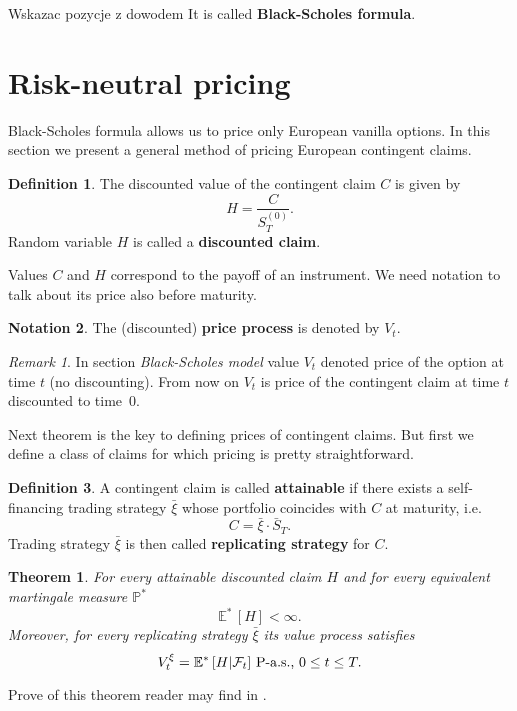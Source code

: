 \documentclass[a4paper,12pt, oneside]{book}
\newtheorem{thm}{Theorem}[section]
\theoremstyle{definition}
\newtheorem{mydef}{Definition}[section]
\newtheorem{notation}[mydef]{Notation}
\theoremstyle{remark}
\newtheorem{remark}{Remark}
\def\Em{{\mathbb{E}^*}\,}
\def\Pm{{\mathbb{P}}^*\,}
\def\Sa{\bar{S}}
\def\xia{\bar{\xi}}
\begin{document}
{\Large \color{red} Wskazac pozycje z dowodem}
It is called \textbf{Black-Scholes formula}.

\section{Risk-neutral pricing}
\label{sec:risk-neutral}
Black-Scholes formula allows us to price only European vanilla options. In this section we present a general method of pricing European contingent claims. 
\begin{mydef}
 The discounted value of the contingent claim $C$ is given by
 \begin{equation*}
  H = \frac{C}{S^{(0)}_T}.
 \end{equation*}
 Random variable $H$ is called a \textbf{discounted claim}.
\end{mydef}

Values $C$ and $H$ correspond to the payoff of an instrument. We need notation to talk about its price also before maturity.
\begin{notation}
 The (discounted) \textbf{price process} is denoted by $V_t$. 
\end{notation}
\begin{remark}
 In section \textit{Black-Scholes model} value $V_t$ denoted price of the option at time $t$ (no discounting). From now on $V_t$ is price of the contingent claim at time $t$ discounted to time~$0$.
\end{remark}

Next theorem is the key to defining prices of contingent claims. But first we define a class of claims for which pricing is pretty straightforward. 
\begin{mydef}
 A contingent claim is called \textbf{attainable} if there exists a self-financing trading strategy $\xia$ whose portfolio coincides with $C$ at maturity, i.e.
 \[ C = \xia \cdot \Sa_T. \]
 Trading strategy $\xia$ is then called \textbf{replicating strategy} for $C$.
\end{mydef}

\begin{thm}
 For every attainable discounted claim $H$ and for every equivalent martingale measure $\Pm$
 \[ \Em [H] < \infty. \]
 Moreover, for every replicating strategy $\xia$ its value process satisfies
 \begin{equation}
  V^\xi_t = \Em[H | \mathcal{F}_t] \hbox{ P-a.s., } 0 \leq t \leq T .
 \end{equation}
\end{thm}
Prove of this theorem reader may find in \cite{follmer}.
\end{document}
